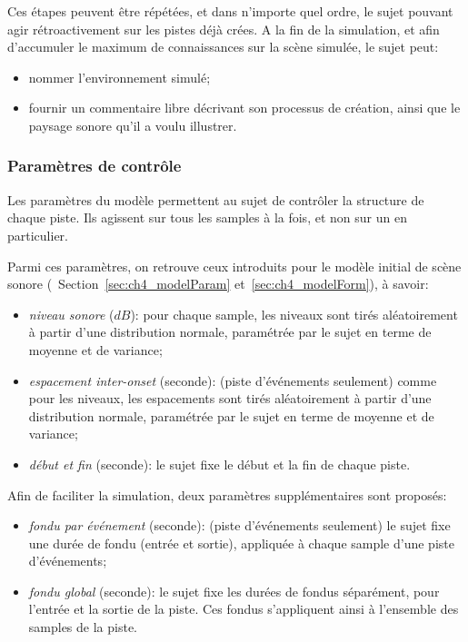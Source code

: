 Ces étapes peuvent être répétées, et dans n'importe quel ordre, le sujet pouvant agir rétroactivement sur les pistes déjà crées. A la fin de la simulation, et afin d'accumuler le maximum de connaissances sur la scène simulée, le sujet peut: 

\begin{itemize}
\item nommer l'environnement simulé;
\item fournir un commentaire libre décrivant son processus de création, ainsi que le paysage sonore qu'il a voulu illustrer.
\end{itemize}

\subsubsection{Paramètres de contrôle}
\label{sec:ch4_param}

Les paramètres du modèle permettent au sujet de contrôler la structure de chaque piste. Ils agissent sur tous les samples à la fois, et non sur un en particulier.

Parmi ces paramètres, on retrouve ceux introduits pour le modèle initial de scène sonore (\cf~Section~\ref{sec:ch4_modelParam} et~\ref{sec:ch4_modelForm}), à savoir:

\begin{itemize}
\item \emph{niveau sonore} ($dB$): pour chaque sample, les niveaux sont tirés aléatoirement à partir d'une distribution normale, paramétrée par le sujet en terme de moyenne et de variance;
\item \emph{espacement inter-onset} (seconde): (piste d'événements seulement) comme pour les niveaux, les espacements sont tirés aléatoirement à partir d'une distribution normale, paramétrée par le sujet en terme de moyenne et de variance;
\item \emph{début et fin} (seconde): le sujet fixe le début et la fin de chaque piste.
\end{itemize}

Afin de faciliter la simulation, deux paramètres supplémentaires sont proposés:

\begin{itemize}
\item \emph{fondu par événement} (seconde): (piste d'événements seulement) le sujet fixe une durée de fondu (entrée et sortie), appliquée à chaque sample d'une piste d'événements;
\item \emph{fondu global} (seconde): le sujet fixe les durées de fondus séparément, pour l'entrée et la sortie de la piste. Ces fondus s'appliquent ainsi à l'ensemble des samples de la piste.
\end{itemize}

